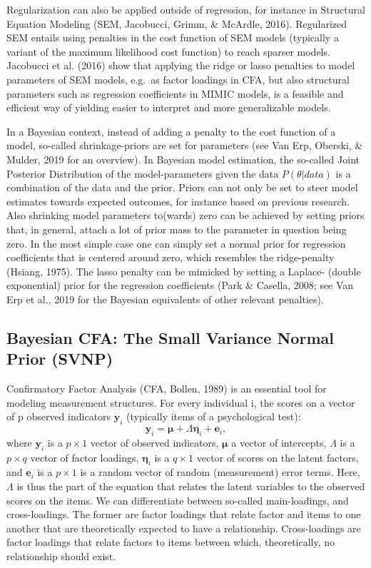 \documentclass[
  man, donotrepeattitle,floatsintext]{apa6}
\begin{document}
Regularization can also be applied outside of regression, for instance in Structural Equation Modeling (SEM, Jacobucci, Grimm, \& McArdle, 2016). Regularized SEM entails using penalties in the cost function of SEM models (typically a variant of the maximum likelihood cost function) to reach sparser models. Jacobucci et al. (2016) show that applying the ridge or lasso penalties to model parameters of SEM models, e.g.~as factor loadings in CFA, but also structural parameters such as regression coefficients in MIMIC models, is a feasible and efficient way of yielding easier to interpret and more generalizable models.

In a Bayesian context, instead of adding a penalty to the cost function of a model, so-called shrinkage-priors are set for parameters (see Van Erp, Oberski, \& Mulder, 2019 for an overview). In Bayesian model estimation, the so-called Joint Posterior Distribution of the model-parameters given the data \(P({\theta} | data)\) is a combination of the data and the prior. Priors can not only be set to steer model estimates towards expected outcomes, for instance based on previous research. Also shrinking model parameters to(wards) zero can be achieved by setting priors that, in general, attach a lot of prior mass to the parameter in question being zero. In the most simple case one can simply set a normal prior for regression coefficients that is centered around zero, which resembles the ridge-penalty (Hsiang, 1975). The lasso penalty can be mimicked by setting a Laplace- (double exponential) prior for the regression coefficients (Park \& Casella, 2008; see Van Erp et al., 2019 for the Bayesian equivalents of other relevant penalties).

\hypertarget{bayesian-cfa-the-small-variance-normal-prior-svnp}{%
\subsection{Bayesian CFA: The Small Variance Normal Prior (SVNP)}\label{bayesian-cfa-the-small-variance-normal-prior-svnp}}

Confirmatory Factor Analysis (CFA, Bollen, 1989) is an essential tool for modeling measurement structures. For every individual i, the scores on a vector of p observed indicators \(\mathbf{y}_i\) (typically items of a psychological test):
\[\boldsymbol{y}_i = \boldsymbol{\mu} + \Lambda \boldsymbol{\eta}_i + \boldsymbol{e}_i ,\]
where \(\boldsymbol{y}_i\) is a \(p \times 1\) vector of observed indicators, \(\boldsymbol{\mu}\) a vector of intercepts, \(\Lambda\) is a \(p \times q\) vector of factor loadings, \(\boldsymbol{\eta}_i\) is a \(q \times 1\) vector of scores on the latent factors, and \(\boldsymbol{e}_i\) is a \(p \times 1\) is a random vector of random (measurement) error terms. Here, \(\Lambda\) is thus the part of the equation that relates the latent variables to the observed scores on the items. We can differentiate between so-called main-loadings, and cross-loadings. The former are factor loadings that relate factor and items to one another that are theoretically expected to have a relationship. Cross-loadings are factor loadings that relate factors to items between which, theoretically, no relationship should exist.
\end{document}
